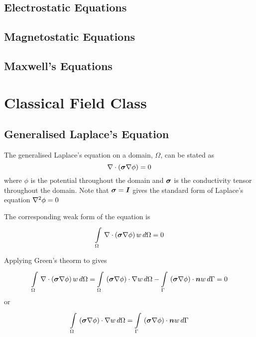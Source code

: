 \subsection{Electrostatic Equations}

\subsection{Magnetostatic Equations}

\subsection{Maxwell's Equations}

\section{Classical Field Class}

\subsection{Generalised Laplace's Equation}

The generalised Laplace's equation on a domain, $\Omega$, can be stated as
\begin{equation}
   \nabla\cdot\left( \boldsymbol{\sigma}\nabla\phi \right) =0
  \label{eqn:Laplacesequation}
\end{equation}
where $\phi$ is the potential throughout the domain and $\boldsymbol{\sigma}$ is
the conductivity tensor throughout the domain. Note that 
$\boldsymbol{\sigma}=\boldsymbol{I}$ gives the standard form of Laplace's equation \ie $\nabla^{2} {\phi}=0$

The corresponding weak form of the equation  is
\begin{equation}
    \displaystyle\int\limits_{\Omega}^{} \, \nabla\cdot\left( \boldsymbol{\sigma}\nabla\phi \right) w\,d\Omega =0
  \label{eqn:Laplaceweakform}
\end{equation}

Applying Green's theorm to  gives
\begin{equation}
  \gint{\Omega}{}{\diverg{\pbrac{\tensor{\sigma}\grad\phi}}w}{\Omega}= 
  \gint{\Omega}{}{\dotprod{\pbrac{\tensor{\sigma}\grad\phi}}{\grad w}}{\Omega}-
  \gint{\Gamma}{}{\dotprod{\pbrac{\tensor{\sigma}\grad\phi}}{\vect{n}}w}{\Gamma}
  =0
\end{equation}
or
\begin{equation}
  \gint{\Omega}{}{\dotprod{\pbrac{\tensor{\sigma}\grad\phi}}{\grad w}}{\Omega}=
  \gint{\Gamma}{}{\dotprod{\pbrac{\tensor{\sigma}\grad\phi}}{\vect{n}w}}{\Gamma}
  \label{eqn:Laplaceweightedresidualform}
\end{equation}

